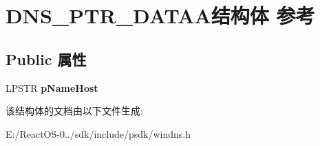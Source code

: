 \hypertarget{struct_d_n_s___p_t_r___d_a_t_a_a}{}\section{D\+N\+S\+\_\+\+P\+T\+R\+\_\+\+D\+A\+T\+A\+A结构体 参考}
\label{struct_d_n_s___p_t_r___d_a_t_a_a}
\subsection*{Public 属性}
\begin{DoxyCompactItemize}
\item 
\mbox{\label{struct_d_n_s___p_t_r___d_a_t_a_a_a6e5192428d0d5e6f9ded43d3d69b9951}} 
L\+P\+S\+TR {\bfseries p\+Name\+Host}
\end{DoxyCompactItemize}


该结构体的文档由以下文件生成\+:\begin{DoxyCompactItemize}
\item 
E\+:/\+React\+O\+S-\/0../sdk/include/psdk/windns.\+h\end{DoxyCompactItemize}
